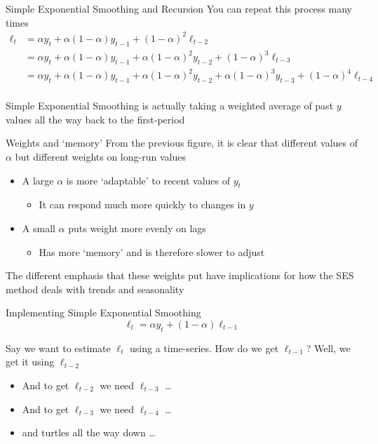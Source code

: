 \documentclass[aspectratio=169,t,11pt,table]{beamer}
\begin{document}
\begin{frame}{Simple Exponential Smoothing and Recursion}
  You can repeat this process many times
  \begin{align*}
    \ell_{t} 
    &= \alpha y_t + \alpha (1 - \alpha) y_{t-1} + (1 - \alpha)^2 \ell_{t-2}  \\
    &= \alpha y_t + \alpha (1 - \alpha) y_{t-1} + \alpha (1 - \alpha)^2  y_{t-2} + (1- \alpha)^3 \ell_{t-3}  \\
    &= \alpha y_t + \alpha (1 - \alpha) y_{t-1} + \alpha (1 - \alpha)^2  y_{t-2} + \alpha (1- \alpha)^3 y_{t-3} + (1 - \alpha)^4 \ell_{t-4}  \\
  \end{align*}

  Simple Exponential Smoothing is actually taking a weighted average of past $y$ values all the way back to the first-period
\end{frame}


\begin{frame}{Weights and `memory'}
  From the previous figure, it is clear that different values of $\alpha$ but different weights on long-run values
  \begin{itemize}
    \item A large $\alpha$ is more `adaptable' to recent values of $y_t$
    \begin{itemize}
      \item It can respond much more quickly to changes in $y$
    \end{itemize}
    
    \item A small $\alpha$ puts weight more evenly on lags
    \begin{itemize}
      \item Has more `memory' and is therefore slower to adjust
    \end{itemize}
  \end{itemize}

  \bigskip
  The different emphasis that these weights put have implications for how the SES method deals with trends and seasonality
\end{frame}

\begin{frame}{Implementing Simple Exponential Smoothing}
  \vspace*{-\bigskipamount}
  $$
    \ell_{t} = \alpha y_t + (1 - \alpha) \ell_{t-1}
  $$
  
  \bigskip
  Say we want to estimate $\ell_t$ using a time-series. How do we get $\ell_{t-1}$? Well, we get it using $\ell_{t-2}$
  \begin{itemize}
    \item And to get $\ell_{t-2}$ we need $\ell_{t-3}$ \dots
    \item And to get $\ell_{t-3}$ we need $\ell_{t-4}$ \dots
    \item and turtles all the way down \dots
  \end{itemize}
\end{frame}
\end{document}
